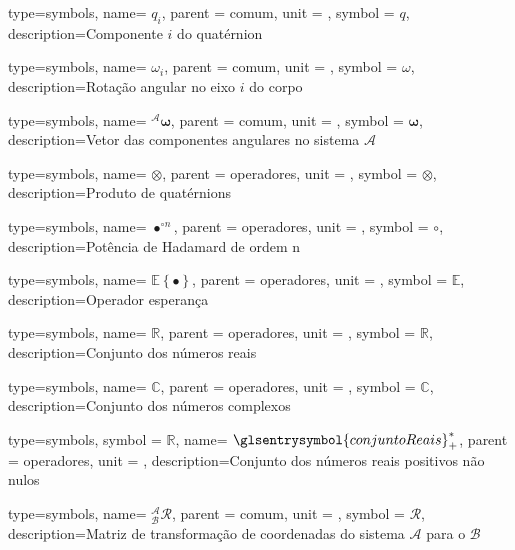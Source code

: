 {type=symbols,
  name= \ensuremath{q_i},
  parent = {comum},
  unit = {},
  symbol = \ensuremath{q},
  description={Componente \ensuremath{i} do quatérnion }
}

{type=symbols,
  name= \ensuremath{\omega_i},
  parent = {comum},
  unit = \unexpanded{{\si{\radian\per\second}}},
  symbol = \ensuremath{\omega},
  description={Rotação angular no eixo \ensuremath{i} do corpo}
}

{type=symbols,
  name= \ensuremath{{}^{\mathcal{A}}\boldsymbol{\omega}},
  parent = {comum},
  unit = \unexpanded{{\si{\radian\per\second}}},
  symbol = \ensuremath{\boldsymbol{\omega}},
  description={Vetor das componentes angulares no sistema \ensuremath{\mathcal{A}}}
}

{type=symbols,
  name= \ensuremath{\otimes},
  parent = {operadores},
  unit = {},
  symbol = \ensuremath{\otimes},
  description={Produto de quatérnions}
}

{type=symbols,
  name= \ensuremath{{\bullet}^{\circ n}},
  parent = {operadores},
  unit = {},
  symbol = \ensuremath{{\circ}},
  description={Potência de Hadamard de ordem n}
}

{type=symbols,
  name= \ensuremath{\mathbb{E}\left\{\bullet \right\}},
  parent = {operadores},
  unit = {},
  symbol = \ensuremath{\mathbb{E}},
  description={Operador esperança}
}

{type=symbols,
  name= \ensuremath{\mathbb{R}},
  parent = {operadores},
  unit = {},
  symbol = \ensuremath{\mathbb{R}},
  description={Conjunto dos números reais}
}


{type=symbols,
  name= \ensuremath{\mathbb{C}},
  parent = {operadores},
  unit = {},
  symbol = \ensuremath{\mathbb{C}},
  description={Conjunto dos números complexos}
}


{type=symbols,
  symbol = \ensuremath{\mathbb{R}},
  name= \ensuremath{\glsentrysymbol{conjuntoReais}^{*}_{+}},
  parent = {operadores},
  unit = {},
  description={Conjunto dos números reais positivos não nulos}
}

{type=symbols,
  name= \ensuremath{{}^{\mathcal{A}}_{\mathcal{B}}\boldsymbol{\mathcal{R}}},
  parent = {comum},
  unit = {},
  symbol = \ensuremath{\boldsymbol{\mathcal{R}}},
  description={Matriz de transformação de coordenadas do sistema  \ensuremath{\mathcal{A}} para o \ensuremath{\mathcal{B}}}
}


